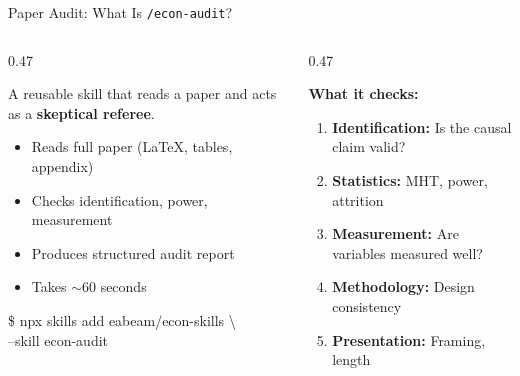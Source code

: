 \documentclass[aspectratio=169, 10pt]{beamer}
\begin{document}
\begin{frame}[fragile]{Paper Audit: What Is \texttt{/econ-audit}?}
\vskip-2pt
\begin{columns}[T]
\begin{column}{0.47\textwidth}
\begin{tcolorbox}[keybox, title={\faSearch\quad Adversarial Review Skill}, top=3pt, bottom=3pt]
\small
A reusable skill that reads a paper and acts as a \textbf{skeptical referee}.
\vskip3pt
\begin{itemize}\setlength{\itemsep}{1pt}
  \item Reads full paper (LaTeX, tables, appendix)
  \item Checks identification, power, measurement
  \item Produces structured audit report
  \item Takes $\sim$60 seconds
\end{itemize}
\end{tcolorbox}
\vskip3pt
\begin{tcolorbox}[colback=DarkSlate, colframe=DarkSlate, arc=2pt,
  left=4pt, right=4pt, top=2pt, bottom=2pt]
{\color{CoolGray}\ttfamily\scriptsize \$ npx skills add eabeam/econ-skills \textbackslash\\
\quad\quad --skill econ-audit}
\end{tcolorbox}
\end{column}
\begin{column}{0.47\textwidth}
\begin{tcolorbox}[accentbox, top=3pt, bottom=3pt]
\small
\textbf{What it checks:}
\vskip3pt
\begin{enumerate}\setlength{\itemsep}{1pt}
  \item \textbf{Identification:} Is the causal claim valid?
  \item \textbf{Statistics:} MHT, power, attrition
  \item \textbf{Measurement:} Are variables measured well?
  \item \textbf{Methodology:} Design consistency
  \item \textbf{Presentation:} Framing, length
\end{enumerate}
\end{tcolorbox}
\end{column}
\end{columns}
\end{frame}
\end{document}
